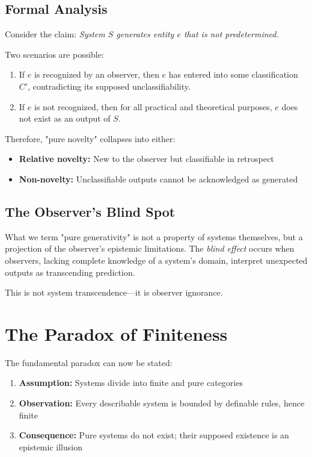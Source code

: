 \documentclass[11pt,a4paper]{article}
\begin{document}
    \subsection{Formal Analysis}

    Consider the claim: \textit{System $S$ generates entity $e$ that is not predetermined.}

    Two scenarios are possible:
    \begin{enumerate}
        \item If $e$ is recognized by an observer, then $e$ has entered into some classification $C'$, contradicting its supposed unclassifiability.

        \item If $e$ is not recognized, then for all practical and theoretical purposes, $e$ does not exist as an output of $S$.
    \end{enumerate}

    Therefore, "pure novelty" collapses into either:
    \begin{itemize}
        \item \textbf{Relative novelty:} New to the observer but classifiable in retrospect
        \item \textbf{Non-novelty:} Unclassifiable outputs cannot be acknowledged as generated
    \end{itemize}

    \subsection{The Observer's Blind Spot}

    What we term "pure generativity" is not a property of systems themselves, but a projection of the observer's epistemic limitations. The \textit{blind effect} occurs when observers, lacking complete knowledge of a system's domain, interpret unexpected outputs as transcending prediction.

    This is not system transcendence—it is observer ignorance.

    \section{The Paradox of Finiteness}

    The fundamental paradox can now be stated:

    \begin{theorem}
        \begin{enumerate}
            \item \textbf{Assumption:} Systems divide into finite and pure categories
            \item \textbf{Observation:} Every describable system is bounded by definable rules, hence finite
            \item \textbf{Consequence:} Pure systems do not exist; their supposed existence is an epistemic illusion
        \end{enumerate}
    \end{theorem}
\end{document}
